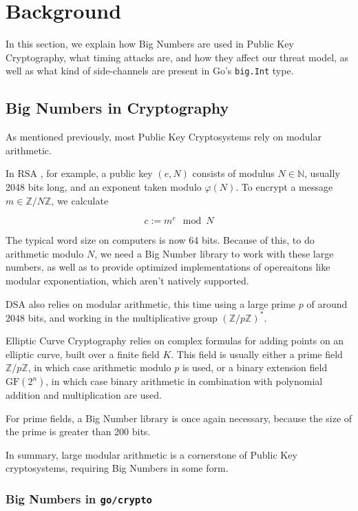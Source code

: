 \documentclass[11pt, a4paper, twocolumn]{article} %
\begin{document}
{\section{Background}

In this section, we explain how Big Numbers are used in Public Key
Cryptography, what timing attacks are, and how they affect our threat
model, as well as what kind of side-channels are present in Go's
\texttt{big.Int} type.

\subsection{Big Numbers in Cryptography}

As mentioned previously, most Public Key Cryptosystems rely on
modular arithmetic.

In RSA \cite{rivest_method_1978}, for example, a public key $(e, N)$ consists of modulus
$N \in \mathbb{N}$, usually 2048 bits long, and an exponent taken
modulo $\varphi(N)$.
To encrypt a message $m \in \mathbb{Z}/N\mathbb{Z}$, we calculate

$$
c := m^e \mod N
$$

The typical word size on computers is now 64 bits. Because of this,
to do arithmetic modulo $N$, we need a Big Number library to work
with these large numbers, as well as to provide optimized implementations
of opereaitons like modular exponentiation, which aren't natively supported.

DSA
\cite{technology_digital_1994} also relies on modular arithmetic,
this time using a large prime $p$ of around 2048 bits, and working
in the multiplicative group $(\mathbb{Z}/p\mathbb{Z})^*$.

Elliptic Curve Cryptography
\cite{miller_use_1986} relies on complex formulas for adding points
on an elliptic curve, built over a finite field $K$. This field
is usually either a prime field $\mathbb{Z}/p\mathbb{Z}$, in which case arithmetic
modulo $p$ is used, or a
binary extension field $\text{GF}(2^n)$, in which case
binary arithmetic in combination with polynomial addition and multiplication
are used.

For prime fields, a Big Number library is once again necessary, because
the size of the prime is greater than 200 bits.

In summary, large modular arithmetic is a cornerstone of Public Key
cryptosystems, requiring Big Numbers in some form.

\subsubsection{Big Numbers in \texttt{go/crypto}}

}
\end{document}
